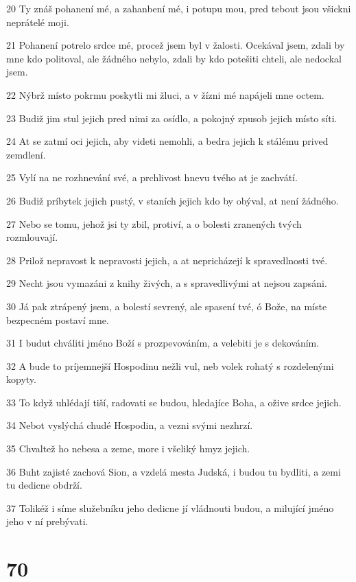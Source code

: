 \par 20 Ty znáš pohanení mé, a zahanbení mé, i potupu mou, pred tebout jsou všickni neprátelé moji.
\par 21 Pohanení potrelo srdce mé, procež jsem byl v žalosti. Ocekával jsem, zdali by mne kdo politoval, ale žádného nebylo, zdali by kdo potešiti chteli, ale nedockal jsem.
\par 22 Nýbrž místo pokrmu poskytli mi žluci, a v žízni mé napájeli mne octem.
\par 23 Budiž jim stul jejich pred nimi za osídlo, a pokojný zpusob jejich místo síti.
\par 24 At se zatmí oci jejich, aby videti nemohli, a bedra jejich k stálému prived zemdlení.
\par 25 Vylí na ne rozhnevání své, a prchlivost hnevu tvého at je zachvátí.
\par 26 Budiž príbytek jejich pustý, v staních jejich kdo by obýval, at není žádného.
\par 27 Nebo se tomu, jehož jsi ty zbil, protiví, a o bolesti zranených tvých rozmlouvají.
\par 28 Prilož nepravost k nepravosti jejich, a at nepricházejí k spravedlnosti tvé.
\par 29 Necht jsou vymazáni z knihy živých, a s spravedlivými at nejsou zapsáni.
\par 30 Já pak ztrápený jsem, a bolestí sevrený, ale spasení tvé, ó Bože, na míste bezpecném postaví mne.
\par 31 I budut chváliti jméno Boží s prozpevováním, a velebiti je s dekováním.
\par 32 A bude to príjemnejší Hospodinu nežli vul, neb volek rohatý s rozdelenými kopyty.
\par 33 To když uhlédají tiší, radovati se budou, hledajíce Boha, a ožive srdce jejich.
\par 34 Nebot vyslýchá chudé Hospodin, a vezni svými nezhrzí.
\par 35 Chvaltež ho nebesa a zeme, more i všeliký hmyz jejich.
\par 36 Buht zajisté zachová Sion, a vzdelá mesta Judská, i budou tu bydliti, a zemi tu dedicne obdrží.
\par 37 Tolikéž i síme služebníku jeho dedicne jí vládnouti budou, a milující jméno jeho v ní prebývati.

\chapter{70}

